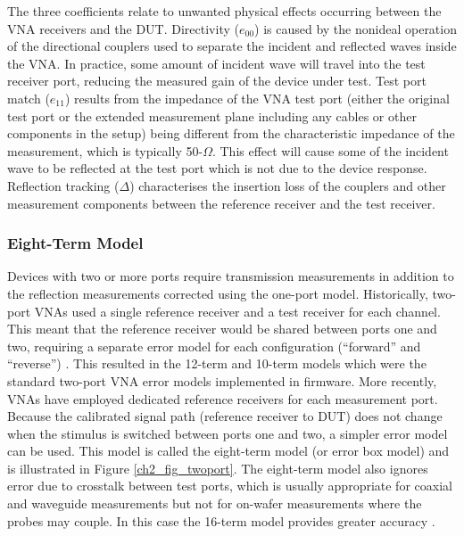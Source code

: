 \documentclass[../thesis/thesis.tex]{subfiles}
\begin{document}
The three coefficients relate to unwanted physical effects occurring between the VNA receivers and the DUT. Directivity ($e_{00}$) is caused by the nonideal operation of the directional couplers used to separate the incident and reflected waves inside the VNA. In practice, some amount of incident wave will travel into the test receiver port, reducing the measured gain of the device under test.
Test port match ($e_{11}$) results from the impedance of the VNA test port (either the original test port or the extended measurement plane including any cables or other components in the setup) being different from the characteristic impedance of the measurement, which is typically 50-$\Omega$. This effect will cause some of the incident wave to be reflected at the test port which is not due to the device response.
Reflection tracking ($\Delta$) characterises the insertion loss of the couplers and other measurement components between the reference receiver and the test receiver.

\subsubsection{Eight-Term Model}

Devices with two or more ports require transmission measurements in addition to the reflection measurements corrected using the one-port model. Historically, two-port VNAs used a single reference receiver and a test receiver for each channel. This meant that the reference receiver would be shared between ports one and two, requiring a separate error model for each configuration (``forward'' and ``reverse'') \cite{Rehnmark_1974}. This resulted in the 12-term and 10-term models which were the standard two-port VNA error models implemented in firmware. More recently, VNAs have employed dedicated reference receivers for each measurement port. Because the calibrated signal path (reference receiver to DUT) does not change when the stimulus is switched between ports one and two, a simpler error model can be used. This model is called the eight-term model (or error box model) and is illustrated in Figure \ref{ch2_fig_twoport}. The eight-term model also ignores error due to crosstalk between test ports, which is usually appropriate for coaxial and waveguide measurements but not for on-wafer measurements where the probes may couple. In this case the 16-term model provides greater accuracy \cite{Butler_1991}.
\end{document}
